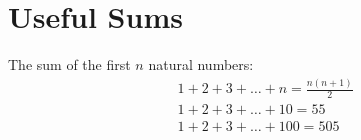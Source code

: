 \documentclass[12pt]{article}
\begin{document}
\begin{comment}
So, our final answer is 28.

Let’s go for another example: √3969 (square root of 3969)

    The magnitude of the “hundreds number” is 39. Now, 62=36 and 72=49. So, the highest square in 39 is 6.
    Looking at the last digit of the number which is 9; we know if the number ends in a 9 then the last digit of the answer would be 3 or 7.

Now, 6 (findings in step-1) times its next higher number 7 is (6×7=) 42. And 39 (the left extremities) is less than 42. Therefore, the right digit of the answer must be the smaller option i.e. 3.

So, our final answer is 63.

So, Square root of 5476 (√5476) = ?

    The numbers preceding the last two digits is 54; the highest square in it is 7.
    The last digit of the number is 6 so; the ending digit of the answer would be 4 or 6.

Now, 7 times its next higher number (8) is 56. Since 54 is less than 56, the right digit of the answer must be the smaller option i.e. 4.

So, our final answer is 74.

Square root of 13689 (√13689) = ?

    Focusing 136; the highest square in it is 11 (since, 112 = 121 and 122 = 144).
    The last digit of the number is 9 so; the ending digit of the answer would be 3 or 7.

11 times its next higher number (12) is 132 and 136 is greater than 132, so the right digit of the answer would be 7.

So, the final answer is 117.

Square root of 15376 (√15376) = ?

    The highest square in 153 is 12 (122 = 144 and 132 = 169).
    The last digit of the number 6 makes the ending digit of the answer a possibility of 4 or 6.

12 times its next higher number (13) is 156. Since 153 is less than 156, the right digit of the answer must be 4 giving the final answer 124.


\end{comment}

\section*{Useful Sums}
The sum of the first $n$ natural numbers:
\begin{align*}
& 1+2+3+\ldots+n = \frac{n(n+1)}{2} \\
& 1+2+3+\ldots+10 = 55 \\
& 1+2+3+\ldots+100 = 505
\end{align*}
\end{document}

